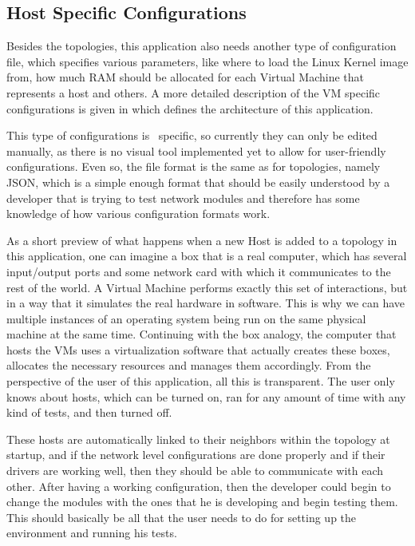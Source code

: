 \subsection{Host Specific Configurations}
\label{sub-sec:host-specific-configurations}

Besides the topologies, this application also needs another type of configuration file, which specifies various parameters, like where to load the Linux Kernel image from, how much RAM should be allocated for each Virtual Machine that represents a host and others.
A more detailed description of the VM specific configurations is given in  which defines the architecture of this application.

This type of configurations is \project\ specific, so currently they can only be edited manually, as there is no visual tool implemented yet to allow for user-friendly configurations.
Even so, the file format is the same as for topologies, namely JSON, which is a simple enough format that should be easily understood by a developer that is trying to test network modules and therefore has some knowledge of how various configuration formats work.

As a short preview of what happens when a new Host is added to a topology in this application, one can imagine a box that is a real computer, which has several input/output ports and some network card with which it communicates to the rest of the world.
A Virtual Machine performs exactly this set of interactions, but in a way that it simulates the real hardware in software.
This is why we can have multiple instances of an operating system being run on the same physical machine at the same time.
Continuing with the box analogy, the computer that hosts the VMs uses a virtualization software that actually creates these boxes, allocates the necessary resources and manages them accordingly.
From the perspective of the user of this application, all this is transparent.
The user only knows about hosts, which can be turned on, ran for any amount of time with any kind of tests, and then turned off.

These hosts are automatically linked to their neighbors within the topology at startup, and if the network level configurations are done properly and if their drivers are working well, then they should be able to communicate with each other.
After having a working configuration, then the developer could begin to change the modules with the ones that he is developing and begin testing them.
This should basically be all that the user needs to do for setting up the environment and running his tests.
